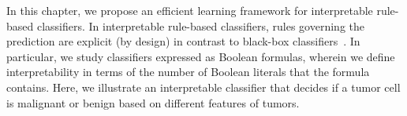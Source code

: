 \label{chapter:imli}
In this chapter, we propose an efficient learning framework for interpretable rule-based classifiers. In interpretable rule-based classifiers, rules governing the prediction are explicit (by design) in contrast to black-box classifiers~\cite{rudin2019stop}. 
In particular, we study classifiers expressed as Boolean formulas, wherein we define interpretability in terms of the number of Boolean literals that the formula contains. Here, we illustrate an interpretable classifier that decides if a tumor cell is malignant or benign based on different features of tumors.

\vspace{1em}
\vspace{1em}



